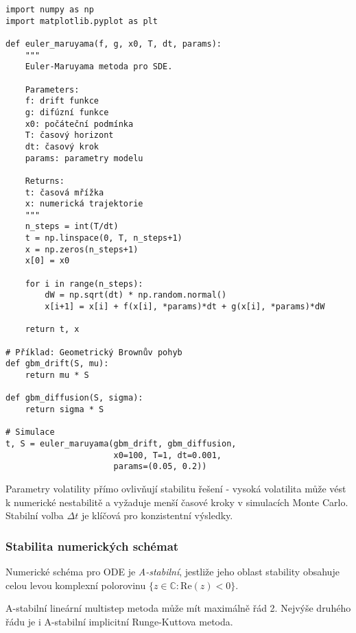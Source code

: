 \begin{code}
\begin{verbatim}
import numpy as np
import matplotlib.pyplot as plt

def euler_maruyama(f, g, x0, T, dt, params):
    """
    Euler-Maruyama metoda pro SDE.
    
    Parameters:
    f: drift funkce
    g: difúzní funkce  
    x0: počáteční podmínka
    T: časový horizont
    dt: časový krok
    params: parametry modelu
    
    Returns:
    t: časová mřížka
    x: numerická trajektorie
    """
    n_steps = int(T/dt)
    t = np.linspace(0, T, n_steps+1)
    x = np.zeros(n_steps+1)
    x[0] = x0
    
    for i in range(n_steps):
        dW = np.sqrt(dt) * np.random.normal()
        x[i+1] = x[i] + f(x[i], *params)*dt + g(x[i], *params)*dW
    
    return t, x

# Příklad: Geometrický Brownův pohyb
def gbm_drift(S, mu):
    return mu * S

def gbm_diffusion(S, sigma):
    return sigma * S

# Simulace
t, S = euler_maruyama(gbm_drift, gbm_diffusion, 
                      x0=100, T=1, dt=0.001, 
                      params=(0.05, 0.2))
\end{verbatim}
\end{code}

\begin{keyinsight}
Parametry volatility přímo ovlivňují stabilitu řešení - vysoká volatilita může vést k numerické nestabilitě a vyžaduje menší časové kroky v simulacích Monte Carlo. Stabilní volba $\Delta t$ je klíčová pro konzistentní výsledky.
\end{keyinsight}

\subsubsection{Stabilita numerických schémat}

\begin{definition}[A-stabilita]
Numerické schéma pro ODE je \emph{A-stabilní}, jestliže jeho oblast stability obsahuje celou levou komplexní polorovinu $\{z \in \mathbb{C} : \mathrm{Re}(z) < 0\}$.
\end{definition}

\begin{theorem}
A-stabilní lineární multistep metoda může mít maximálně řád 2. Nejvýše druhého řádu je i A-stabilní implicitní Runge-Kuttova metoda.
\end{theorem}

